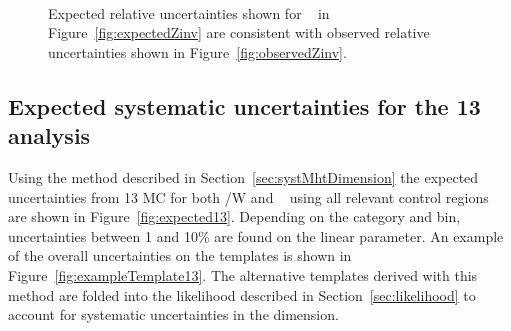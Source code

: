 \begin{figure}[h!]
  \centering
  ~~
  \\
  \caption{\label{fig:expectedObservedZinv}
  Expected relative uncertainties shown for \zInv~ in Figure~\ref{fig:expectedZinv} are consistent
  with observed relative uncertainties shown in Figure~\ref{fig:observedZinv}.}
\end{figure}

\subsection{Expected systematic uncertainties for the 13 \TeV analysis}
\label{sec:syst13TeV}
Using the method described in Section~\ref{sec:systMhtDimension} the expected uncertainties
from 13 \TeV MC for both \ttbar/W  and \zInv~ using all relevant control regions are
shown in Figure~\ref{fig:expected13}. 
Depending on the category and \scalht bin, uncertainties between 1 and 10\% are found
on the linear parameter.
An example of the overall uncertainties on the \mht templates is shown
in Figure~\ref{fig:exampleTemplate13}.
The alternative templates derived with this method are folded into the 
likelihood described in Section~\ref{sec:likelihood} to account for
systematic uncertainties in the \mht dimension.

